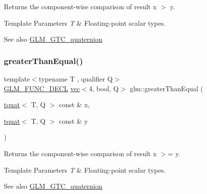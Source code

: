 Returns the component-\/wise comparison of result x $>$ y.


\begin{DoxyTemplParams}{Template Parameters}
{\em T} & Floating-\/point scalar types.\\
\hline
\end{DoxyTemplParams}
\begin{DoxySeeAlso}{See also}
\mbox{\hyperlink{group__gtc__quaternion}{G\+L\+M\+\_\+\+G\+T\+C\+\_\+quaternion}} 
\end{DoxySeeAlso}
\mbox{\label{group__gtc__quaternion_ga293cb3175d9ad290deaf50984716fd44}} 
\subsubsection{\texorpdfstring{greater\+Than\+Equal()}{greaterThanEqual()}}
{\footnotesize\ttfamily template$<$typename T , qualifier Q$>$ \\
\mbox{\hyperlink{setup_8hpp_ab2d052de21a70539923e9bcbf6e83a51}{G\+L\+M\+\_\+\+F\+U\+N\+C\+\_\+\+D\+E\+CL}} \mbox{\hyperlink{structglm_1_1vec}{vec}}$<$4, bool, Q$>$ glm\+::greater\+Than\+Equal (\begin{DoxyParamCaption}\item[{\mbox{\hyperlink{structglm_1_1tquat}{tquat}}$<$ T, Q $>$ const \&}]{x,  }\item[{\mbox{\hyperlink{structglm_1_1tquat}{tquat}}$<$ T, Q $>$ const \&}]{y }\end{DoxyParamCaption})}

Returns the component-\/wise comparison of result x $>$= y.


\begin{DoxyTemplParams}{Template Parameters}
{\em T} & Floating-\/point scalar types.\\
\hline
\end{DoxyTemplParams}
\begin{DoxySeeAlso}{See also}
\mbox{\hyperlink{group__gtc__quaternion}{G\+L\+M\+\_\+\+G\+T\+C\+\_\+quaternion}} 
\end{DoxySeeAlso}
\mbox{\label{group__gtc__quaternion_gadc59b59ce71daa5586a64a6acf36c072}} 
